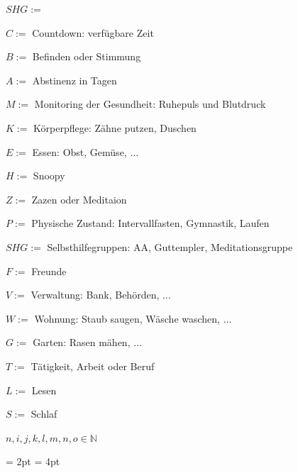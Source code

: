 \documentclass[10pt,a4paper]{article}
\newcommand\mand[1] {{\color {burntorange} {\bf #1}}}     %
\newcommand{\N}{\mathbb{N}}
\begin{document}
\begin{mdframed}[style=daystyle]
  \begin{labeling}{{\mand {$SHG :=$}}}
    \setlength\itemsep{-3pt}
  \item[$C :=$ ]   Countdown: verfügbare Zeit
  \item[$B :=$ ]   Befinden oder Stimmung
  \item[$A :=$ ]   Abstinenz in Tagen
  \item[$M :=$ ]   Monitoring der Gesundheit: Ruhepuls und Blutdruck
  \item[$K :=$ ]   Körperpflege: Zähne putzen, Duschen
  \item[$E :=$ ]   Essen: Obst, Gemüse, $\dots$
  \item[$H :=$ ]   Snoopy
  \item[$Z :=$ ]   Zazen oder Meditaion
  \item[$P :=$ ]   Physische Zustand: Intervallfasten, Gymnastik, Laufen
  \item[$SHG :=$ ] Selbsthilfegruppen: AA, Guttempler, Meditationsgruppe
  \item[$F :=$ ]   Freunde
  \item[$V :=$ ]   Verwaltung: Bank, Behörden, $\ldots$
  \item[$W :=$ ]   Wohnung: Staub saugen, Wäsche waschen, $\ldots$
  \item[$G :=$ ]   Garten: Rasen mähen, $\ldots$
  \item[$T :=$ ]   Tätigkeit, Arbeit oder Beruf
  \item[$L :=$ ]   Lesen
  \item[$S :=$ ]   Schlaf
\end{labeling}
\end{mdframed}

$n,i,j,k,l,m,n,o \in \N$

\fboxrule = 2pt %
\fboxsep  = 4pt  %
\end{document}
